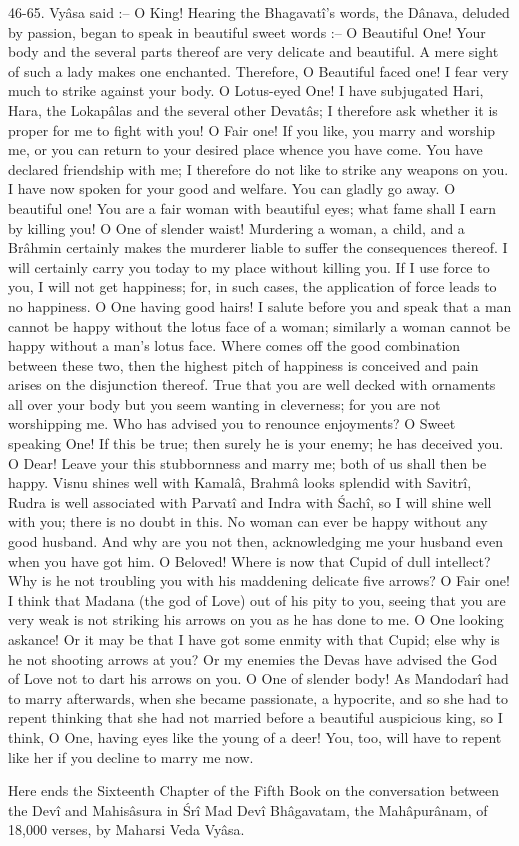 46-65. Vy\^asa said :-- O King! Hearing the Bhagavat\^i's words, the D\^anava, deluded by passion, began to speak in beautiful sweet words :-- O Beautiful One! Your body and the several parts thereof are very delicate and beautiful. A mere sight of such a lady makes one enchanted. Therefore, O Beautiful faced one! I fear very much to strike against your body. O Lotus-eyed One! I have subjugated Hari, Hara, the Lokap\^alas and the several other Devat\^as; I therefore ask whether it is proper for me to fight with you! O Fair one! If you like, you marry and worship me, or you can return to your desired place whence you have come. You have declared friendship with me; I therefore do not like to strike any weapons on you. I have now spoken for your good and welfare. You can gladly go away. O beautiful one! You are a fair woman with beautiful eyes; what fame shall I earn by killing you! O One of slender waist! Murdering a woman, a child, and a Br\^ahmin certainly makes the murderer liable to suffer the consequences thereof. I will certainly carry you today to my place without killing you. If I use force to you, I will not get happiness; for, in such cases, the application of force leads to no happiness. O One having good hairs! I salute before you and speak that a man cannot be happy without the lotus face of a woman; similarly a woman cannot be happy without a man's lotus face. Where comes off the good combination between these two, then the highest pitch of happiness is conceived and pain arises on the disjunction thereof. True that you are well decked with ornaments all over your body but you seem wanting in cleverness; for you are not worshipping me. Who has advised you to renounce enjoyments? O Sweet speaking One! If this be true; then surely he is your enemy; he has deceived you. O Dear! Leave your this stubbornness and marry me; both of us shall then be happy. Visnu shines well with Kamal\^a, Brahm\^a looks splendid with Savitr\^i, Rudra is well associated with Parvat\^i and Indra with \'Sach\^i, so I will shine well with you; there is no doubt in this. No woman can ever be happy without any good husband. And why are you not then, acknowledging me your husband even when you have got him. O Beloved! Where is now that Cupid of dull intellect? Why is he not troubling you with his maddening delicate five arrows? O Fair one! I think that Madana (the god of Love) out of his pity to you, seeing that you are very weak is not striking his arrows on you as he has done to me. O One looking askance! Or it may be that I have got some enmity with that Cupid; else why is he not shooting arrows at you? Or my enemies the Devas have advised the God of Love not to dart his arrows on you. O One of slender body! As Mandodar\^i had to marry afterwards, when she became passionate, a hypocrite, and so she had to repent thinking that she had not married before a beautiful auspicious king, so I think, O One, having eyes like the young of a deer! You, too, will have to repent like her if you decline to marry me now.

Here ends the Sixteenth Chapter of the Fifth Book on the conversation between the Dev\^i and Mahis\^asura in \'Sr\^i Mad Dev\^i Bh\^agavatam, the Mah\^apur\^anam, of 18,000 verses, by Maharsi Veda Vy\^asa.